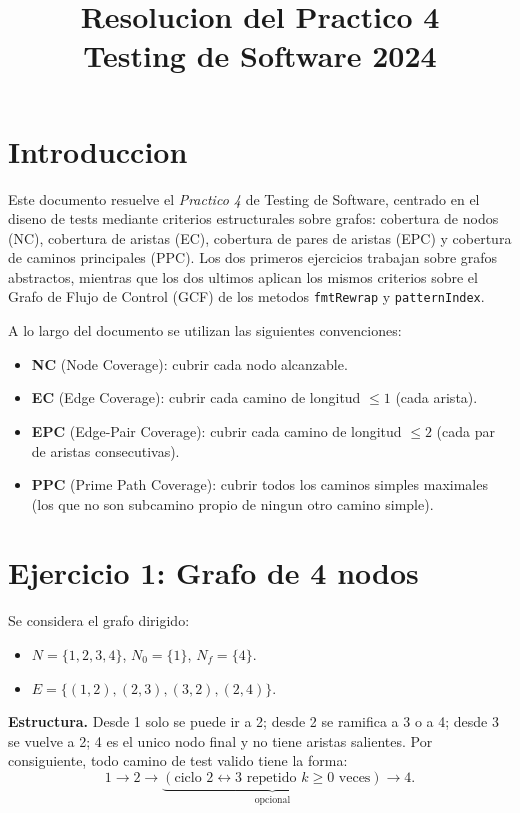 \documentclass[12pt,a4paper]{article}
\title{\textbf{Resolucion del Practico 4}\\Testing de Software 2024}
\author{}
\date{}
\begin{document}
\maketitle
\tableofcontents
\newpage

\section*{Introduccion}

Este documento resuelve el \textit{Practico 4} de Testing de Software, centrado en el diseno de
tests mediante criterios estructurales sobre grafos: cobertura de nodos (NC), cobertura de aristas
(EC), cobertura de pares de aristas (EPC) y cobertura de caminos principales (PPC). Los dos
primeros ejercicios trabajan sobre grafos abstractos, mientras que los dos ultimos aplican los
mismos criterios sobre el Grafo de Flujo de Control (GCF) de los metodos \texttt{fmtRewrap} y
\texttt{patternIndex}.

A lo largo del documento se utilizan las siguientes convenciones:

\begin{itemize}
  \item \textbf{NC} (Node Coverage): cubrir cada nodo alcanzable.
  \item \textbf{EC} (Edge Coverage): cubrir cada camino de longitud $\le 1$ (cada arista).
  \item \textbf{EPC} (Edge-Pair Coverage): cubrir cada camino de longitud $\le 2$ (cada par de
  aristas consecutivas).
  \item \textbf{PPC} (Prime Path Coverage): cubrir todos los caminos simples maximales (los que
  no son subcamino propio de ningun otro camino simple).
\end{itemize}

\section{Ejercicio 1: Grafo de 4 nodos}

Se considera el grafo dirigido:
\begin{itemize}
  \item $N = \{1, 2, 3, 4\}$, $N_0 = \{1\}$, $N_f = \{4\}$.
  \item $E = \{(1,2), (2,3), (3,2), (2,4)\}$.
\end{itemize}

\textbf{Estructura.} Desde 1 solo se puede ir a 2; desde 2 se ramifica a 3 o a 4; desde 3 se
vuelve a 2; 4 es el unico nodo final y no tiene aristas salientes. Por consiguiente, todo camino
de test valido tiene la forma:
\[
1 \to 2 \to \underbrace{(\text{ciclo } 2 \leftrightarrow 3 \text{ repetido } k \ge 0 \text{ veces})}_{\text{opcional}} \to 4.
\]
\end{document}
